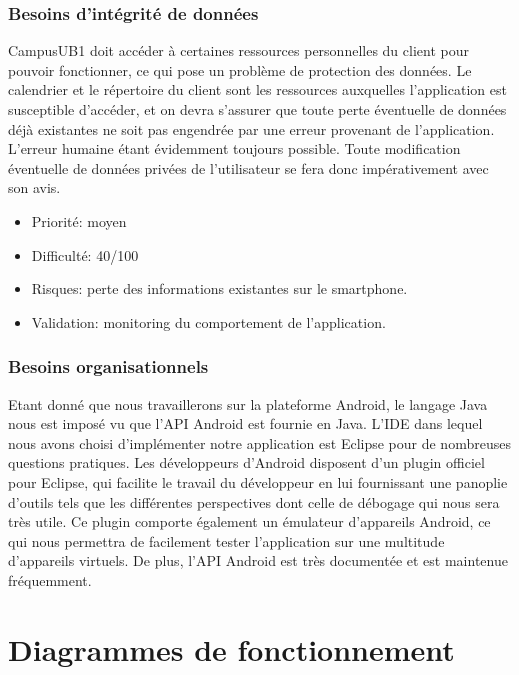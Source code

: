 \documentclass [pdftex,12pt] {report}
\begin{document}
\subsection{Besoins d'intégrité de données}
CampusUB1 doit accéder à certaines ressources personnelles du client pour pouvoir fonctionner, ce qui pose un problème de protection des données. Le calendrier et le répertoire du client sont les ressources auxquelles l'application est susceptible d'accéder, et on devra s'assurer que toute perte éventuelle de données déjà existantes ne soit pas engendrée par une erreur provenant de l'application. L'erreur humaine étant évidemment toujours possible. Toute modification éventuelle de données privées de l'utilisateur se fera donc impérativement avec son avis. \\

\begin{itemize}
\renewcommand{\labelitemi}{$\bullet$}
\item Priorité: moyen
\item Difficulté: 40/100
\item Risques: perte des informations existantes sur le smartphone.
\item Validation: monitoring du comportement de l'application.
\end{itemize} 


\subsection{Besoins organisationnels}
Etant donné que nous travaillerons sur la plateforme Android, le langage Java nous est imposé vu que l'API Android est fournie en Java.
L'IDE dans lequel nous avons choisi d'implémenter notre application est Eclipse pour de nombreuses questions pratiques. Les développeurs d'Android disposent d'un plugin officiel pour Eclipse, qui facilite le travail du développeur en lui fournissant une panoplie d'outils tels que les différentes perspectives dont celle de débogage qui nous sera très utile. Ce plugin comporte également un émulateur d'appareils Android, ce qui nous permettra de facilement tester l'application sur une multitude d'appareils virtuels. De plus, l'API Android est très documentée et est maintenue fréquemment.



\chapter{Diagrammes de fonctionnement}
\end{document}
